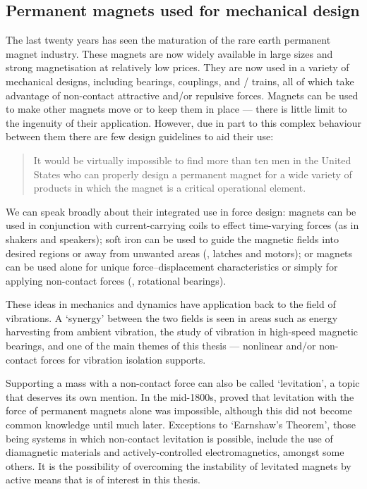\documentclass[11pt,a4paper]{memoir}
\begin{document}
\subsection{Permanent magnets used for mechanical design}

The last twenty years has seen the maturation of the rare earth permanent magnet industry.
These magnets are now widely available in large sizes and strong magnetisation at relatively low prices.
They are now used in a variety of mechanical designs, including bearings, couplings, and \maglev/ trains, all of which take advantage of non-contact attractive and/or repulsive forces.
Magnets can be used to make other magnets move or to keep them in place — there is little limit to the ingenuity of their application.
However, due in part to this complex behaviour between them there are few design guidelines to aid their use:
\begin{quote}
It would be virtually impossible to find more than ten men in the United States who can properly design a permanent magnet for a wide variety of products in which the magnet is a critical operational element. \cite{moskowitz1995}
\end{quote}
We can speak broadly about their integrated use in force design: magnets can be used in conjunction with current-carrying coils to effect time-varying forces (as in shakers and speakers); soft iron can be used to guide the magnetic fields into desired regions or away from unwanted areas (\eg, latches and motors); or magnets can be used alone for unique force--displacement characteristics or simply for applying non-contact forces (\eg, rotational bearings).

These ideas in mechanics and dynamics have application back to the field of vibrations.
A `synergy' between the two fields is seen in areas such as energy harvesting from ambient vibration, the study of vibration in high-speed magnetic bearings, and one of the main themes of this thesis — nonlinear and/or non-contact forces for vibration isolation supports.

Supporting a mass with a non-contact force can also be called `levitation', a topic that deserves its own mention.
In the mid-1800s, \textcite{earnshaw1842} proved that levitation with the force of permanent magnets alone was impossible, although this did not become common knowledge  until much later.
Exceptions to `Earnshaw's Theorem', those being systems in which non-contact levitation is possible, include the use of diamagnetic materials and actively-controlled electromagnetics, amongst some others.
It is the possibility of overcoming the instability of levitated magnets by active means that is of interest in this thesis.
\end{document}
